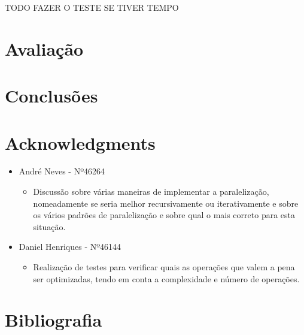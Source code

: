 \documentclass[a4paper]{article}
\begin{document}
TODO FAZER O TESTE SE TIVER TEMPO

\section{Avaliação}

\section{Conclusões}

\section{Acknowledgments}
\begin{itemize}
\item André Neves - Nº46264
\begin{itemize}
\item Discussão sobre várias maneiras de implementar a paralelização, nomeadamente se seria melhor recursivamente ou iterativamente e sobre os vários padrões de paralelização e sobre qual o mais correto para esta situação.
\end{itemize}
\item Daniel Henriques - Nº46144
\begin{itemize}
\item Realização de testes para verificar quais as operações que valem a pena ser optimizadas, tendo em conta a complexidade e número de operações.
\end{itemize}

\end{itemize}

\section{Bibliografia}
\end{document}
